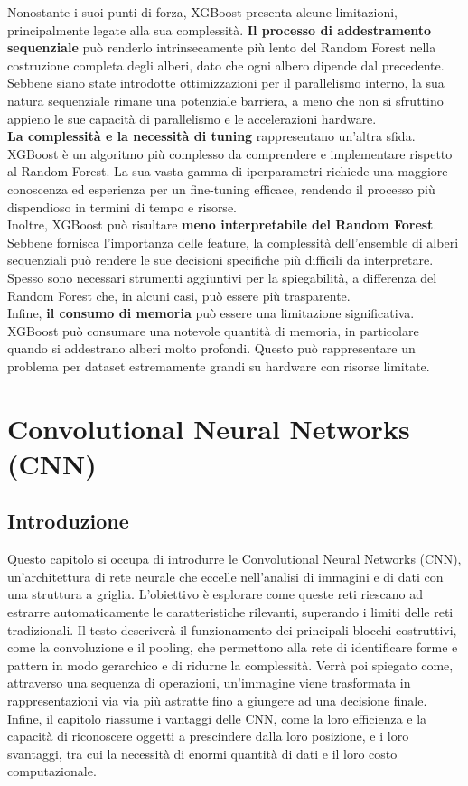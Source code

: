 \documentclass[a4paper,12pt]{report}
\begin{document}
	Nonostante i suoi punti di forza, XGBoost presenta alcune limitazioni, principalmente legate alla sua complessità. \textbf{Il processo di addestramento sequenziale} può renderlo intrinsecamente più lento del Random Forest nella costruzione completa degli alberi, dato che ogni albero dipende dal precedente. Sebbene siano state introdotte ottimizzazioni per il parallelismo interno, la sua natura sequenziale rimane una potenziale barriera, a meno che non si sfruttino appieno le sue capacità di parallelismo e le accelerazioni hardware. \\
	\textbf{La complessità e la necessità di tuning} rappresentano un'altra sfida. XGBoost è un algoritmo più complesso da comprendere e implementare rispetto al Random Forest. La sua vasta gamma di iperparametri richiede una maggiore conoscenza ed esperienza per un fine-tuning efficace, rendendo il processo più dispendioso in termini di tempo e risorse. \\
	Inoltre, XGBoost può risultare \textbf{meno interpretabile del Random Forest}. Sebbene fornisca l'importanza delle feature, la complessità dell'ensemble di alberi sequenziali può rendere le sue decisioni specifiche più difficili da interpretare. Spesso sono necessari strumenti aggiuntivi per la spiegabilità, a differenza del Random Forest che, in alcuni casi, può essere più trasparente. \\
	Infine, \textbf{il consumo di memoria} può essere una limitazione significativa. XGBoost può consumare una notevole quantità di memoria, in particolare quando si addestrano alberi molto profondi. Questo può rappresentare un problema per dataset estremamente grandi su hardware con risorse limitate.
	
	\chapter{Convolutional Neural Networks (CNN)}
	
	\section{Introduzione}
	Questo capitolo si occupa di introdurre le Convolutional Neural Networks (CNN), un'architettura di rete neurale che eccelle nell'analisi di immagini e di dati con una struttura a griglia. L'obiettivo è esplorare come queste reti riescano ad estrarre automaticamente le caratteristiche rilevanti, superando i limiti delle reti tradizionali. Il testo descriverà il funzionamento dei principali blocchi costruttivi, come la convoluzione e il pooling, che permettono alla rete di identificare forme e pattern in modo gerarchico e di ridurne la complessità. Verrà poi spiegato come, attraverso una sequenza di operazioni, un'immagine viene trasformata in rappresentazioni via via più astratte fino a giungere ad una decisione finale. Infine, il capitolo riassume i vantaggi delle CNN, come la loro efficienza e la capacità di riconoscere oggetti a prescindere dalla loro posizione, e i loro svantaggi, tra cui la necessità di enormi quantità di dati e il loro costo computazionale.
	
\end{document}

